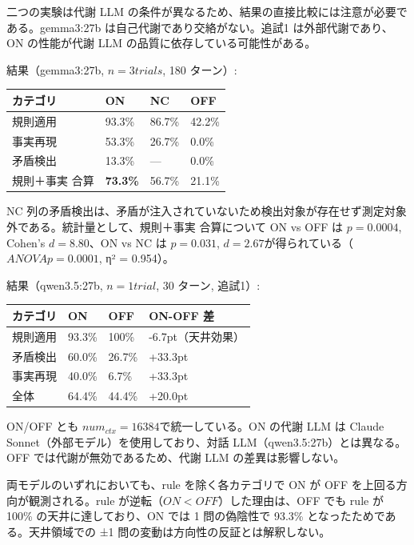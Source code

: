 \documentclass[12pt,a4paper]{article}
\begin{document}
二つの実験は代謝 LLM の条件が異なるため、結果の直接比較には注意が必要である。gemma3:27b は自己代謝であり交絡がない。追試1 は外部代謝であり、ON の性能が代謝 LLM の品質に依存している可能性がある。

結果（gemma3:27b, \(n=3 trials\), 180 ターン）:

{\def\LTcaptype{table} %
\begin{longtable}[]{@{}llll@{}}
\toprule\noalign{}
カテゴリ & ON & NC & OFF \\
\midrule\noalign{}
\endhead
\bottomrule\noalign{}
\endlastfoot
規則適用 & 93.3\% & 86.7\% & 42.2\% \\
事実再現 & 53.3\% & 26.7\% & 0.0\% \\
矛盾検出 & 13.3\% & --- & 0.0\% \\
規則＋事実 合算 & \textbf{73.3\%} & 56.7\% & 21.1\% \\
\end{longtable}
}

NC 列の矛盾検出は、矛盾が注入されていないため検出対象が存在せず測定対象外である。統計量として、規則＋事実 合算について ON vs OFF は \(p = 0.0004\), Cohen's \(d = 8.80\)、ON vs NC は \(p = 0.031\), \(d = 2.67\)が得られている（\(ANOVA p = 0.0001\), η² = 0.954）。

結果（qwen3.5:27b, \(n=1 trial\), 30 ターン, 追試1）:

{\def\LTcaptype{table} %
\begin{longtable}[]{@{}llll@{}}
\toprule\noalign{}
カテゴリ & ON & OFF & ON-OFF 差 \\
\midrule\noalign{}
\endhead
\bottomrule\noalign{}
\endlastfoot
規則適用 & 93.3\% & 100\% & -6.7pt（天井効果） \\
矛盾検出 & 60.0\% & 26.7\% & +33.3pt \\
事実再現 & 40.0\% & 6.7\% & +33.3pt \\
全体 & 64.4\% & 44.4\% & +20.0pt \\
\end{longtable}
}

ON/OFF とも \(num_{ctx}=16384\)で統一している。ON の代謝 LLM は Claude Sonnet（外部モデル）を使用しており、対話 LLM（qwen3.5:27b）とは異なる。OFF では代謝が無効であるため、代謝 LLM の差異は影響しない。

両モデルのいずれにおいても、rule を除く各カテゴリで ON が OFF を上回る方向が観測される。rule が逆転（\(ON < OFF\)）した理由は、OFF でも rule が 100\% の天井に達しており、ON では 1 問の偽陰性で 93.3\% となったためである。天井領域での ±1 問の変動は方向性の反証とは解釈しない。
\end{document}
